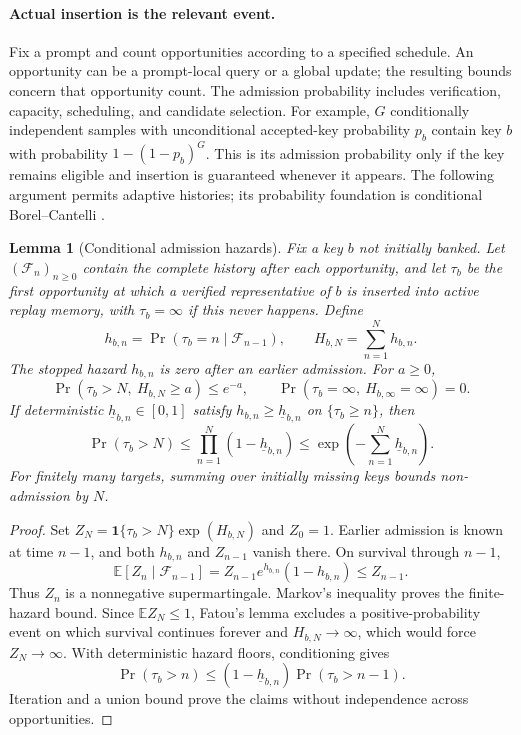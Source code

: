 \documentclass{article}
\newcommand{\1}{\mathbf 1}
\newtheorem{lemma}{Lemma}[section]
\theoremstyle{remark}
\theoremstyle{definition}
\theoremstyle{plain}
\begin{document}
\paragraph{Actual insertion is the relevant event.}
Fix a prompt and count opportunities according to a specified schedule.
An opportunity can be a prompt-local query or a global update; the resulting
bounds concern that opportunity count. The admission probability includes
verification, capacity, scheduling, and candidate selection. For example,
$G$ conditionally independent samples with unconditional accepted-key probability $p_b$
contain key $b$ with probability $1-(1-p_b)^G$. This is its admission
probability only if the key remains eligible and insertion is guaranteed
whenever it appears. The following argument permits adaptive histories;
its probability foundation is conditional Borel--Cantelli
\citep[Theorem~4.3.4]{durrett2019probability}.

\begin{lemma}[Conditional admission hazards]
\label{ext:lem-admission-hazards}
Fix a key $b$ not initially banked. Let $(\mathcal F_n)_{n\ge0}$ contain the
complete history after each opportunity, and let $\tau_b$ be the first
opportunity at which a verified representative of $b$ is inserted into active
replay memory, with $\tau_b=\infty$ if this never happens. Define
\[
 h_{b,n}=\Pr(\tau_b=n\mid\mathcal F_{n-1}),\qquad
 H_{b,N}=\sum_{n=1}^N h_{b,n}.
\]
The stopped hazard $h_{b,n}$ is zero after an earlier admission. For $a\ge0$,
\begin{equation}
 \Pr(\tau_b>N,\ H_{b,N}\ge a)\le e^{-a},\qquad
 \Pr(\tau_b=\infty,\ H_{b,\infty}=\infty)=0.
 \label{ext:eq-admission-hazards}
\end{equation}
If deterministic $\underline h_{b,n}\in[0,1]$ satisfy
$h_{b,n}\ge\underline h_{b,n}$ on $\{\tau_b\ge n\}$, then
\begin{equation}
 \Pr(\tau_b>N)\le\prod_{n=1}^N(1-\underline h_{b,n})
 \le\exp\!\left(-\sum_{n=1}^N\underline h_{b,n}\right).
 \label{ext:eq-admission-floors}
\end{equation}
For finitely many targets, summing over initially missing keys bounds
non-admission by $N$.
\end{lemma}
\begin{proof}
Set $Z_N=\mathbf1\{\tau_b>N\}\exp(H_{b,N})$ and $Z_0=1$. Earlier admission
is known at time $n-1$, and both $h_{b,n}$ and $Z_{n-1}$ vanish there.
On survival through $n-1$,
\[
 \mathbb E[Z_n\mid\mathcal F_{n-1}]
 =Z_{n-1}e^{h_{b,n}}(1-h_{b,n})\le Z_{n-1}.
\]
Thus $Z_n$ is a nonnegative supermartingale. Markov's inequality proves the
finite-hazard bound. Since $\mathbb E Z_N\le1$, Fatou's lemma excludes a
positive-probability event on which survival continues forever and
$H_{b,N}\to\infty$, which would force $Z_N\to\infty$. With deterministic
hazard floors, conditioning gives
\[
 \Pr(\tau_b>n)\le(1-\underline h_{b,n})\Pr(\tau_b>n-1).
\]
Iteration and a union bound prove the claims without independence across
opportunities.
\end{proof}
\end{document}
